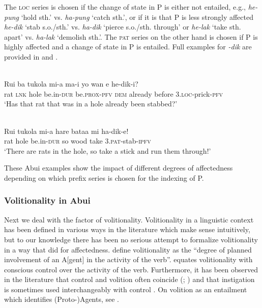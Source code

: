 The \textsc{loc} series is chosen if the change of state in P is either not entailed, e.g., \textit{he-pung} `hold sth.' vs. \textit{ha-pung} `catch sth.', or if it is that P is less strongly affected \textit{he-dik} `stab s.o./sth.' vs. \textit{ha-dik} `pierce s.o./sth. through' or \textit{he-lak} `take sth. apart' vs. \textit{ha-lak} `demolish sth.'. The \textsc{pat} series on the other hand is chosen if P is highly affected and a change of state in P is entailed. Full examples for \textit{{}-dik} are provided in  and .


\ea%
\label{bkm:Ref383697370}
 \\ 
\gll  Rui  ba  tukola  mi-a  ma-i  yo  wan  e  he-dik-i?      \\  
   rat  \textsc{lnk} hole  be.in-\textsc{dur} be.\textsc{prox-pfv} \textsc{dem}  already    before  3.\textsc{loc}{}-prick-\textsc{pfv} \\
\glt `Has that rat that was in a hole already been stabbed?'
\z
  


\ea%
\label{bkm:Ref383697375}
 \\ 
\gll   Rui  tukola  mi-a  hare  bataa    mi  ha-dik-e! \\  
    rat  hole  be.in-\textsc{dur} so  wood  take  3.\textsc{pat}{}-stab-\textsc{ipfv} \\
\glt  `There are rats in the hole, so take a stick and run them through!'
\z



 



These Abui examples show the impact of different degrees of affectedness depending on which prefix series is chosen for the indexing of P.

\clearpage
\subsubsection{Volitionality in Abui}
Next we deal with the factor of volitionality. Volitionality in a linguistic context has been defined in various ways in the literature which make sense intuitively, but to our knowledge there has been no serious attempt to formalize volitionality in a way that \citet{Beavers2011} did for affectedness. \citet[286]{HopperEtAl1980} define volitionality as the ``degree of planned involvement of an A[gent] in the activity of the verb''. \citet[52]{DeLancey1985} equates volitionality with conscious control over the activity of the verb. Furthermore, it has been observed in the literature that control and volition often coincide (\citealt[392]{Tsunoda1985}; \citealt[56]{DeLancey1985}) and that instigation is sometimes used interchangeably with control \citep[45]{Naess2007}. On volition as an entailment which identifies (Proto-)Agents, see \citet{Dowty1991}.

